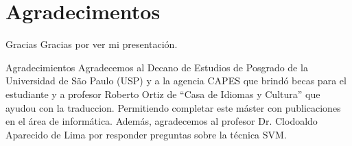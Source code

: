 \section{Agradecimentos}

\begin{frame}
	\begin{block}{Gracias}
		Gracias por ver mi presentación.
	\end{block}
\end{frame}

\begin{frame}
	\begin{block}{Agradecimientos}
		Agradecemos al Decano de Estudios de Posgrado de la Universidad de São Paulo (USP) y a la agencia CAPES que brindó becas para el estudiante y a profesor Roberto Ortiz de ``Casa de Idiomas y Cultura'' que ayudou con la traduccion. Permitiendo completar este máster con publicaciones en el área de informática. Además, agradecemos al profesor Dr. Clodoaldo Aparecido de Lima por responder preguntas sobre la técnica SVM.
	\end{block}
\end{frame}